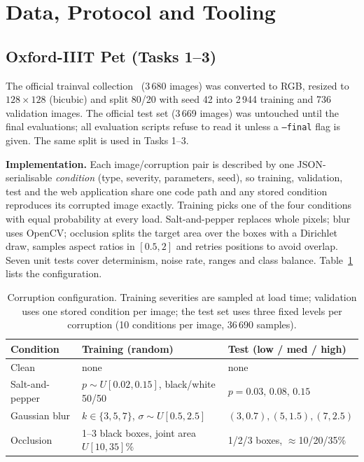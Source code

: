 \documentclass[conference]{IEEEtran}
\begin{document}
\section{Data, Protocol and Tooling}
\subsection{Oxford-IIIT Pet (Tasks 1--3)}
The official trainval collection~\cite{parkhi2012} (3\,680 images) was converted to RGB, resized to $128{\times}128$ (bicubic) and split 80/20 with seed 42 into 2\,944 training and 736 validation images. The official test set (3\,669 images) was untouched until the final evaluations; all evaluation scripts refuse to read it unless a \texttt{--final} flag is given. The same split is used in Tasks 1--3.

\textbf{Implementation.} Each image/corruption pair is described by one JSON-serialisable \emph{condition} (type, severity, parameters, seed), so training, validation, test and the web application share one code path and any stored condition reproduces its corrupted image exactly. Training picks one of the four conditions with equal probability at every load. Salt-and-pepper replaces whole pixels; blur uses OpenCV; occlusion splits the target area over the boxes with a Dirichlet draw, samples aspect ratios in $[0.5,2]$ and retries positions to avoid overlap. Seven unit tests cover determinism, noise rate, ranges and class balance. Table~\ref{tab:corr} lists the configuration.

\begin{table}[t]
\caption{Corruption configuration. Training severities are sampled at load time; validation uses one stored condition per image; the test set uses three fixed levels per corruption (10 conditions per image, 36\,690 samples).}
\label{tab:corr}
\centering\footnotesize
\begin{tabular}{@{}p{1.25cm}p{2.9cm}p{2.9cm}@{}}
\toprule
Condition & Training (random) & Test (low / med / high)\\
\midrule
Clean & none & none\\
Salt-and-pepper & $p\sim U[0.02,0.15]$, black/white 50/50 & $p=0.03,\,0.08,\,0.15$\\
Gaussian blur & $k\in\{3,5,7\}$, $\sigma\sim U[0.5,2.5]$ & $(3,0.7),(5,1.5),(7,2.5)$\\
Occlusion & 1--3 black boxes, joint area $U[10,35]\%$ & 1/2/3 boxes, $\approx$10/20/35\%\\
\bottomrule
\end{tabular}
\end{table}
\end{document}
